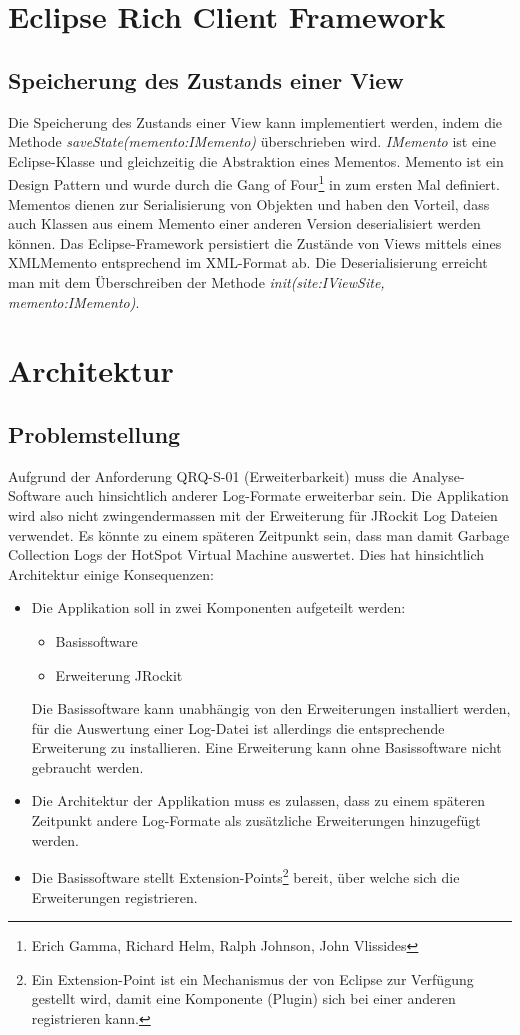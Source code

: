 \section{Eclipse Rich Client Framework}
\subsection{Speicherung des Zustands einer View}\label{memento}
Die Speicherung des Zustands einer View kann implementiert werden, indem die Methode \textit{saveState(memento:IMemento)} überschrieben wird. \textit{IMemento} ist eine Eclipse-Klasse und gleichzeitig die Abstraktion eines Mementos. Memento ist ein Design Pattern und wurde durch die Gang of Four\footnote{Erich Gamma, Richard Helm, Ralph Johnson, John Vlissides} in \cite[S. 283]{gamma1995design} zum ersten Mal definiert. Mementos dienen zur Serialisierung von Objekten und haben den Vorteil, dass auch Klassen aus einem Memento einer anderen Version deserialisiert werden können. Das Eclipse-Framework persistiert die Zustände von Views mittels eines XMLMemento entsprechend im XML-Format ab. Die Deserialisierung erreicht man mit dem Überschreiben der Methode \textit{init(site:IViewSite, memento:IMemento)}.

\section{Architektur}
\subsection{Problemstellung}\label{konzept_uebersicht}
Aufgrund der Anforderung QRQ-S-01 (Erweiterbarkeit) muss die Analyse-Software auch hinsichtlich anderer Log-Formate erweiterbar sein. Die Applikation wird also nicht zwingendermassen mit der Erweiterung für JRockit Log Dateien verwendet. Es könnte zu einem späteren Zeitpunkt sein, dass man damit Garbage Collection Logs der HotSpot Virtual Machine auswertet. Dies hat hinsichtlich Architektur einige Konsequenzen:
\begin{itemize}
	\item Die Applikation soll in zwei Komponenten aufgeteilt werden:
		\begin{itemize}
			\item Basissoftware
			\item Erweiterung JRockit
		\end{itemize}
		Die Basissoftware kann unabhängig von den Erweiterungen installiert werden, für die Auswertung einer Log-Datei ist allerdings die entsprechende Erweiterung zu installieren. Eine Erweiterung kann ohne Basissoftware nicht gebraucht werden.
	\item Die Architektur der Applikation muss es zulassen, dass zu einem späteren Zeitpunkt andere Log-Formate als zusätzliche Erweiterungen hinzugefügt werden.
	\item Die Basissoftware stellt Extension-Points\footnote{Ein Extension-Point ist ein Mechanismus der von Eclipse zur Verfügung gestellt wird, damit eine Komponente (Plugin) sich bei einer anderen registrieren kann.} bereit, über welche sich die Erweiterungen  registrieren.
\end{itemize}

